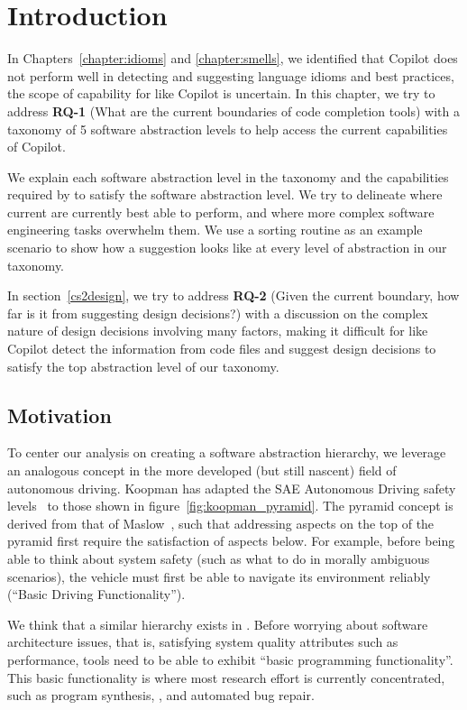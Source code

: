 \label{chapter:framework}

\section{Introduction}
In Chapters~\ref{chapter:idioms} and \ref{chapter:smells}, we identified that Copilot does not perform well in detecting and suggesting language idioms and best practices, 
the scope of capability for \cct{} like Copilot is uncertain. In this chapter, we try to address \textbf{RQ-1} (What are the current boundaries of code completion tools) with a taxonomy of 5 software abstraction levels to help access the current capabilities of Copilot. 

We explain each software abstraction level in the taxonomy and the capabilities required by \cct{} to satisfy the software abstraction level. 
We try to delineate where current \cct{} are currently best able to perform, and where more complex software engineering tasks overwhelm them. We use a sorting routine as an example scenario to show how a \cct{} suggestion looks like at every level of abstraction in our taxonomy.

In section~\ref{cs2design}, we try to address \textbf{RQ-2} (Given the current boundary, how far is it from suggesting design decisions?) with a discussion on the complex nature of design decisions involving many factors, making it difficult for \cct{} like Copilot detect the information from code files and suggest design decisions to satisfy the top abstraction level of our taxonomy.

\subsection{Motivation}
To center our analysis on creating a software abstraction hierarchy, we leverage an analogous concept in the more developed (but still nascent) field of autonomous driving. 
Koopman has adapted the SAE Autonomous Driving safety levels~\cite{sae} to those shown in figure~\ref{fig:koopman_pyramid}. 
The pyramid concept is derived from that of Maslow~\cite{Maslow1943}, such that addressing aspects on the top of the pyramid first require the satisfaction of aspects below. 
For example, before being able to think about system safety (such as what to do in morally ambiguous scenarios), the vehicle must first be able to navigate its environment reliably (``Basic Driving Functionality'').

We think that a similar hierarchy exists in \AISE{}. Before worrying about software architecture issues, that is, satisfying system quality attributes such as performance, \AISE{} tools need to be able to exhibit ``basic programming functionality''. This basic functionality is where most research effort is currently concentrated, such as program synthesis, \cct{}, and automated bug repair.

